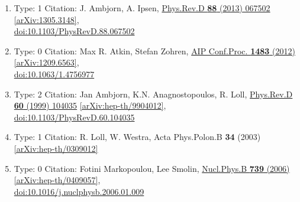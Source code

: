 \documentclass[a4paper,10pt]{article}
\begin{document}
\begin{enumerate}
\begin{enumerate}
  \item Type: 1 Citation: J. Ambjorn, A. Ipsen, \href{https://www.doi.org/10.1103/PhysRevD.88.067502}{Phys.Rev.D {\bf 88} (2013) 067502}  \href{https://arxiv.org/abs/1305.3148}{[arXiv:1305.3148]},\\\href{https://www.doi.org/10.1103/PhysRevD.88.067502}{doi:10.1103/PhysRevD.88.067502}
  \item Type: 0 Citation: Max R. Atkin, Stefan Zohren, \href{https://www.doi.org/10.1063/1.4756977}{AIP Conf.Proc. {\bf 1483} (2012) }  \href{https://arxiv.org/abs/1209.6563}{[arXiv:1209.6563]},\\\href{https://www.doi.org/10.1063/1.4756977}{doi:10.1063/1.4756977}
  \item Type: 2 Citation: Jan Ambjorn, K.N. Anagnostopoulos, R. Loll, \href{https://www.doi.org/10.1103/PhysRevD.60.104035}{Phys.Rev.D {\bf 60} (1999) 104035}  \href{https://arxiv.org/abs/hep-th/9904012}{[arXiv:hep-th/9904012]},\\\href{https://www.doi.org/10.1103/PhysRevD.60.104035}{doi:10.1103/PhysRevD.60.104035}
  \item Type: 1 Citation: R. Loll, W. Westra, Acta Phys.Polon.B {\bf 34} (2003)   \href{https://arxiv.org/abs/hep-th/0309012}{[arXiv:hep-th/0309012]}
  \item Type: 0 Citation: Fotini Markopoulou, Lee Smolin, \href{https://www.doi.org/10.1016/j.nuclphysb.2006.01.009}{Nucl.Phys.B {\bf 739} (2006) }  \href{https://arxiv.org/abs/hep-th/0409057}{[arXiv:hep-th/0409057]},\\\href{https://www.doi.org/10.1016/j.nuclphysb.2006.01.009}{doi:10.1016/j.nuclphysb.2006.01.009}

\end{enumerate}
\end{enumerate}
\end{document}
